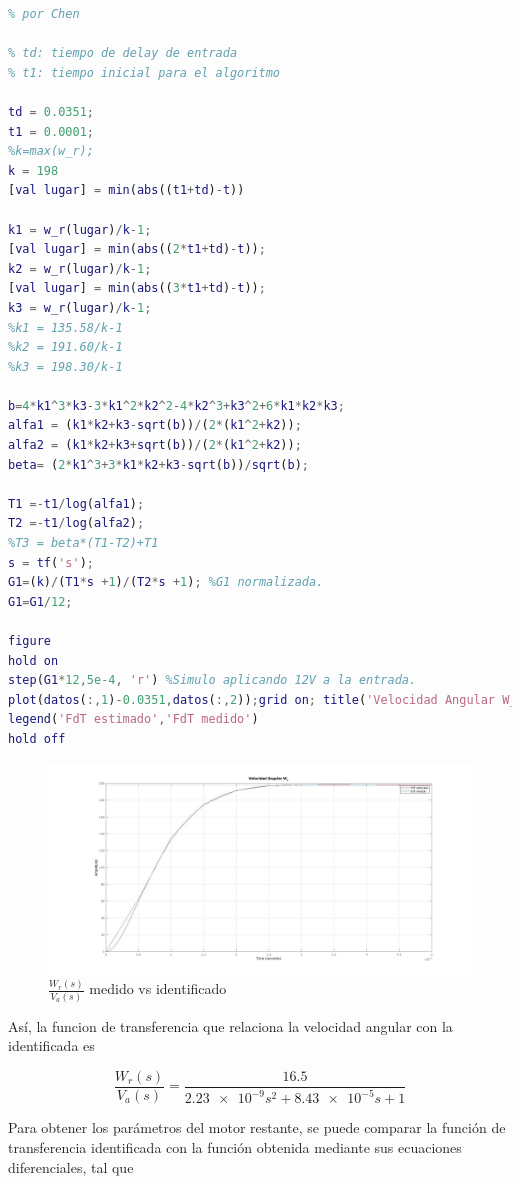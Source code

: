 \documentclass{article}
\begin{document}
\begin{lstlisting}[language=matlab]
%% Determinamos las funciones de transferencia a partir del metodo desarollado
% por Chen

% td: tiempo de delay de entrada
% t1: tiempo inicial para el algoritmo

td = 0.0351;
t1 = 0.0001;
%k=max(w_r);
k = 198
[val lugar] = min(abs((t1+td)-t))

k1 = w_r(lugar)/k-1;
[val lugar] = min(abs((2*t1+td)-t));
k2 = w_r(lugar)/k-1;
[val lugar] = min(abs((3*t1+td)-t));
k3 = w_r(lugar)/k-1;
%k1 = 135.58/k-1
%k2 = 191.60/k-1
%k3 = 198.30/k-1

b=4*k1^3*k3-3*k1^2*k2^2-4*k2^3+k3^2+6*k1*k2*k3;
alfa1 = (k1*k2+k3-sqrt(b))/(2*(k1^2+k2));
alfa2 = (k1*k2+k3+sqrt(b))/(2*(k1^2+k2));
beta= (2*k1^3+3*k1*k2+k3-sqrt(b))/sqrt(b);

T1 =-t1/log(alfa1);
T2 =-t1/log(alfa2);
%T3 = beta*(T1-T2)+T1
s = tf('s');
G1=(k)/(T1*s +1)/(T2*s +1); %G1 normalizada.
G1=G1/12;

figure
hold on
step(G1*12,5e-4, 'r') %Simulo aplicando 12V a la entrada.
plot(datos(:,1)-0.0351,datos(:,2));grid on; title('Velocidad Angular W_r');
legend('FdT estimado','FdT medido')
hold off
\end{lstlisting}

\begin{figure}[!h]
  \centering
  \includegraphics[width=1\textwidth]{img/mot5-2.jpg}
  \caption{$\frac{W_r(s)}{V_a(s)}$ medido vs identificado}
\end{figure}

Así, la funcion de transferencia que relaciona la velocidad angular con la identificada
es

$$\frac{W_r(s)}{V_a(s)}=\frac{16.5}{\num{2.23e-9}s^2+\num{8.43e-5}s+1}$$

Para obtener los parámetros del motor restante, se puede comparar la función de transferencia
identificada con la función obtenida mediante sus ecuaciones diferenciales, tal que
\end{document}
